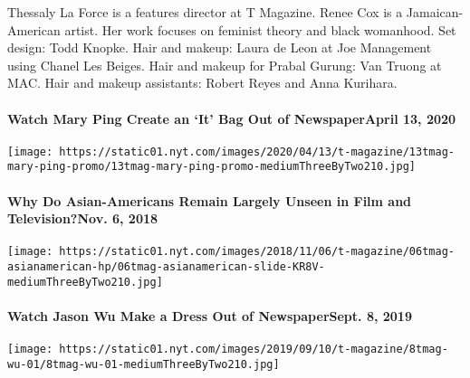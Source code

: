 Thessaly La Force is a features director at T Magazine. Renee Cox is a
Jamaican-American artist. Her work focuses on feminist theory and black
womanhood. Set design: Todd Knopke. Hair and makeup: Laura de Leon at
Joe Management using Chanel Les Beiges. Hair and makeup for Prabal
Gurung: Van Truong at MAC. Hair and makeup assistants: Robert Reyes and
Anna Kurihara.

\href{https://www.nytimes.com/2020/04/13/t-magazine/mary-ping-newspaper-bag.html}{}

\hypertarget{watch-mary-ping-create-an-it-bag-out-of-newspaperapril-13-2020}{%
\paragraph{Watch Mary Ping Create an `It' Bag Out of NewspaperApril 13,
2020}\label{watch-mary-ping-create-an-it-bag-out-of-newspaperapril-13-2020}}

\texttt{[image: https://static01.nyt.com/images/2020/04/13/t-magazine/13tmag-mary-ping-promo/13tmag-mary-ping-promo-mediumThreeByTwo210.jpg]}
\href{https://www.nytimes.com/2018/11/06/t-magazine/asian-american-actors-representation.html}{}

\hypertarget{why-do-asian-americans-remain-largely-unseen-in-film-and-televisionnov-6-2018}{%
\paragraph{Why Do Asian-Americans Remain Largely Unseen in Film and
Television?Nov. 6,
2018}\label{why-do-asian-americans-remain-largely-unseen-in-film-and-televisionnov-6-2018}}

\texttt{[image: https://static01.nyt.com/images/2018/11/06/t-magazine/06tmag-asianamerican-hp/06tmag-asianamerican-slide-KR8V-mediumThreeByTwo210.jpg]}
\href{https://www.nytimes.com/2019/09/08/t-magazine/jason-wu-newspaper-dress.html}{}

\hypertarget{watch-jason-wu-make-a-dress-out-of-newspapersept-8-2019}{%
\paragraph{Watch Jason Wu Make a Dress Out of NewspaperSept. 8,
2019}\label{watch-jason-wu-make-a-dress-out-of-newspapersept-8-2019}}

\texttt{[image: https://static01.nyt.com/images/2019/09/10/t-magazine/8tmag-wu-01/8tmag-wu-01-mediumThreeByTwo210.jpg]}
\href{https://www.nytimes.com/2019/08/26/t-magazine/asian-american-comedians.html}{}

